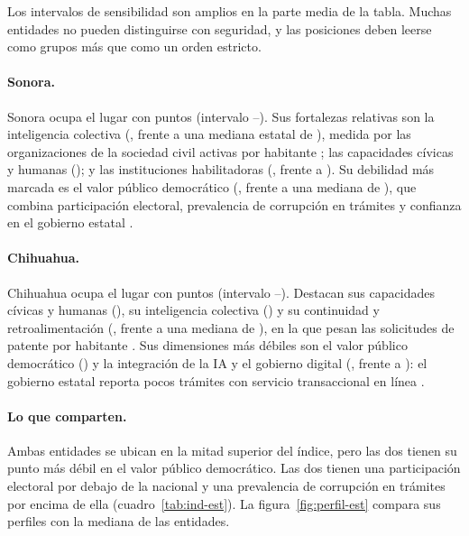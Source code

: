 \documentclass[11pt,a4paper]{article}
\begin{document}


Los intervalos de sensibilidad son amplios en la parte media de la tabla. Muchas entidades no pueden distinguirse con seguridad, y las posiciones deben leerse como grupos más que como un orden estricto.

\paragraph{Sonora.} Sonora ocupa el lugar \SONrango{} con \SONindice{} puntos (intervalo \SONrangoBajo--\SONrangoAlto). Sus fortalezas relativas son la inteligencia colectiva (\SONdimB, frente a una mediana estatal de \EntMedDimB), medida por las organizaciones de la sociedad civil activas por habitante \parencite{bienestar_rfosc_2025}; las capacidades cívicas y humanas (\SONdimA); y las instituciones habilitadoras (\SONdimD, frente a \EntMedDimD). Su debilidad más marcada es el valor público democrático (\SONdimE, frente a una mediana de \EntMedDimE), que combina participación electoral, prevalencia de corrupción en trámites y confianza en el gobierno estatal \parencite{ine_computos_2024,inegi_encig_2025}.

\paragraph{Chihuahua.} Chihuahua ocupa el lugar \CHHrango{} con \CHHindice{} puntos (intervalo \CHHrangoBajo--\CHHrangoAlto). Destacan sus capacidades cívicas y humanas (\CHHdimA), su inteligencia colectiva (\CHHdimB) y su continuidad y retroalimentación (\CHHdimF, frente a una mediana de \EntMedDimF), en la que pesan las solicitudes de patente por habitante \parencite{impi_cifras_2026}. Sus dimensiones más débiles son el valor público democrático (\CHHdimE) y la integración de la IA y el gobierno digital (\CHHdimC, frente a \EntMedDimC): el gobierno estatal reporta pocos trámites con servicio transaccional en línea \parencite{inegi_cnge_2025}.

\paragraph{Lo que comparten.} Ambas entidades se ubican en la mitad superior del índice, pero las dos tienen su punto más débil en el valor público democrático. Las dos tienen una participación electoral por debajo de la nacional y una prevalencia de corrupción en trámites por encima de ella (cuadro~\ref{tab:ind-est}). La figura~\ref{fig:perfil-est} compara sus perfiles con la mediana de las entidades.
\end{document}
